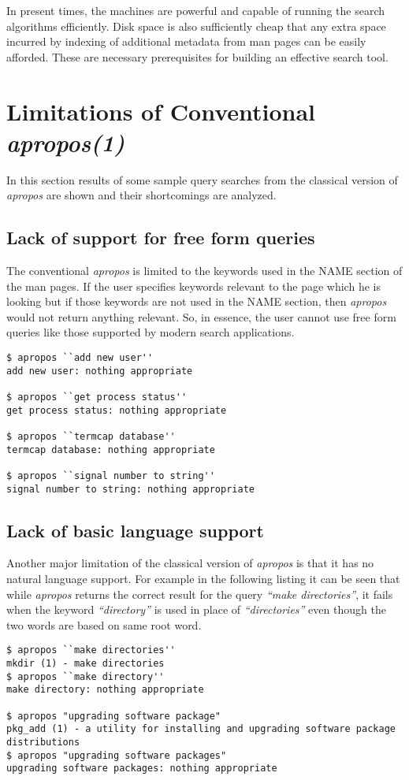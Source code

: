 \documentclass[titlepage, a4paper, 12pt]{article}
\begin{document}
In present times, the machines are powerful and  capable of running the search
algorithms efficiently. Disk
space is also sufficiently cheap that any extra space incurred by indexing of additional metadata from man pages
can be easily afforded. These are necessary prerequisites for building an
effective search tool.

\section{Limitations of Conventional \textit{apropos(1)}}
In this section results of some sample query searches from
the classical version of \textit{apropos} are shown and their shortcomings are
analyzed.

\subsection{Lack of support for free form queries}
The conventional \textit{apropos} is limited to the keywords used in the NAME
section
of the man pages. If the user specifies keywords relevant to the page which he
is looking but if those keywords are not used in the NAME section,
then \textit{apropos} would not return
anything relevant. So, in essence, the user cannot use free form queries like
those supported by modern search applications.
\begin{lstlisting}
$ apropos ``add new user''
add new user: nothing appropriate

$ apropos ``get process status''
get process status: nothing appropriate

$ apropos ``termcap database''
termcap database: nothing appropriate

$ apropos ``signal number to string''
signal number to string: nothing appropriate
\end{lstlisting}

\subsection{Lack of basic language support}
Another major limitation of the classical version of \textit{apropos} is that
it has no
natural language support. For example in the following listing it can be seen
that while \textit{apropos} returns the correct result for the query \textit{``make directories''}, it fails when the keyword \textit{``directory''} is
used in place of \textit{``directories''} even though the two words are based on
same root word.
\begin{lstlisting}
$ apropos ``make directories''
mkdir (1) - make directories
$ apropos ``make directory''
make directory: nothing appropriate

$ apropos "upgrading software package"
pkg_add (1) - a utility for installing and upgrading software package
distributions
$ apropos "upgrading software packages"
upgrading software packages: nothing appropriate
\end{lstlisting}
\end{document}
